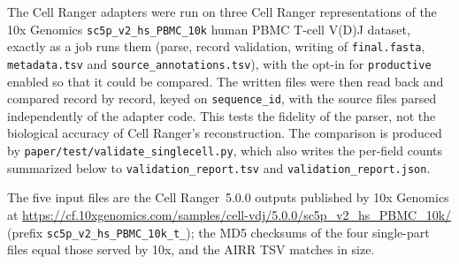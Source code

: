 \documentclass[11pt]{article}
\begin{document}
The Cell Ranger adapters were run on three Cell Ranger representations of the
10x Genomics \texttt{sc5p\_v2\_hs\_PBMC\_10k} human PBMC T-cell V(D)J dataset,
exactly as a job runs them (parse, record validation, writing of
\texttt{final.fasta}, \texttt{metadata.tsv} and
\texttt{source\_annotations.tsv}), with the opt-in for
\texttt{productive} enabled so that it could be compared. The written files
were then read back and compared record by record, keyed on
\texttt{sequence\_id}, with the source files parsed independently of the
adapter code. This tests the fidelity of the parser, not the biological
accuracy of Cell Ranger's reconstruction. The comparison is produced by
\texttt{paper/test/validate\_singlecell.py}, which also writes the per-field
counts summarized below to \texttt{validation\_report.tsv} and
\texttt{validation\_report.json}.

The five input files are the Cell Ranger~5.0.0 outputs published by 10x
Genomics at
\url{https://cf.10xgenomics.com/samples/cell-vdj/5.0.0/sc5p_v2_hs_PBMC_10k/}
(prefix \texttt{sc5p\_v2\_hs\_PBMC\_10k\_t\_}); the MD5 checksums of the four
single-part files equal those served by 10x, and the AIRR TSV matches in size.
\end{document}
